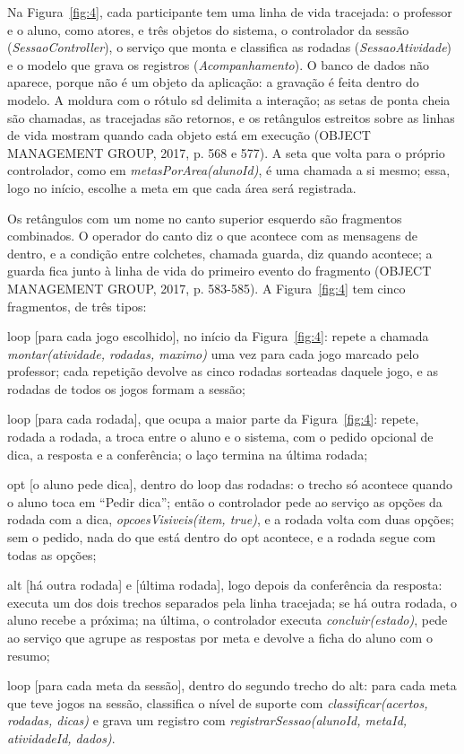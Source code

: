 Na Figura~\ref{fig:4}, cada participante tem uma linha de vida tracejada: o professor e o aluno, como atores, e três objetos do sistema, o controlador da sessão (\textit{SessaoController}), o serviço que monta e classifica as rodadas (\textit{SessaoAtividade}) e o modelo que grava os registros (\textit{Acompanhamento}). O banco de dados não aparece, porque não é um objeto da aplicação: a gravação é feita dentro do modelo. A moldura com o rótulo sd delimita a interação; as setas de ponta cheia são chamadas, as tracejadas são retornos, e os retângulos estreitos sobre as linhas de vida mostram quando cada objeto está em execução (OBJECT MANAGEMENT GROUP, 2017, p. 568 e 577). A seta que volta para o próprio controlador, como em \textit{metasPorArea(alunoId)}, é uma chamada a si mesmo; essa, logo no início, escolhe a meta em que cada área será registrada.

Os retângulos com um nome no canto superior esquerdo são fragmentos combinados. O operador do canto diz o que acontece com as mensagens de dentro, e a condição entre colchetes, chamada guarda, diz quando acontece; a guarda fica junto à linha de vida do primeiro evento do fragmento (OBJECT MANAGEMENT GROUP, 2017, p. 583-585). A Figura~\ref{fig:4} tem cinco fragmentos, de três tipos:

\begin{alineasIFTO}
  \item loop [para cada jogo escolhido], no início da Figura~\ref{fig:4}: repete a chamada \textit{montar(atividade, rodadas, maximo)} uma vez para cada jogo marcado pelo professor; cada repetição devolve as cinco rodadas sorteadas daquele jogo, e as rodadas de todos os jogos formam a sessão;
  \item loop [para cada rodada], que ocupa a maior parte da Figura~\ref{fig:4}: repete, rodada a rodada, a troca entre o aluno e o sistema, com o pedido opcional de dica, a resposta e a conferência; o laço termina na última rodada;
  \item opt [o aluno pede dica], dentro do loop das rodadas: o trecho só acontece quando o aluno toca em “Pedir dica”; então o controlador pede ao serviço as opções da rodada com a dica, \textit{opcoesVisiveis(item, true)}, e a rodada volta com duas opções; sem o pedido, nada do que está dentro do opt acontece, e a rodada segue com todas as opções;
  \item alt [há outra rodada] e [última rodada], logo depois da conferência da resposta: executa um dos dois trechos separados pela linha tracejada; se há outra rodada, o aluno recebe a próxima; na última, o controlador executa \textit{concluir(estado)}, pede ao serviço que agrupe as respostas por meta e devolve a ficha do aluno com o resumo;
  \item loop [para cada meta da sessão], dentro do segundo trecho do alt: para cada meta que teve jogos na sessão, classifica o nível de suporte com \textit{classificar(acertos, rodadas, dicas)} e grava um registro com \textit{registrarSessao(alunoId, metaId, atividadeId, dados)}.
\end{alineasIFTO}

